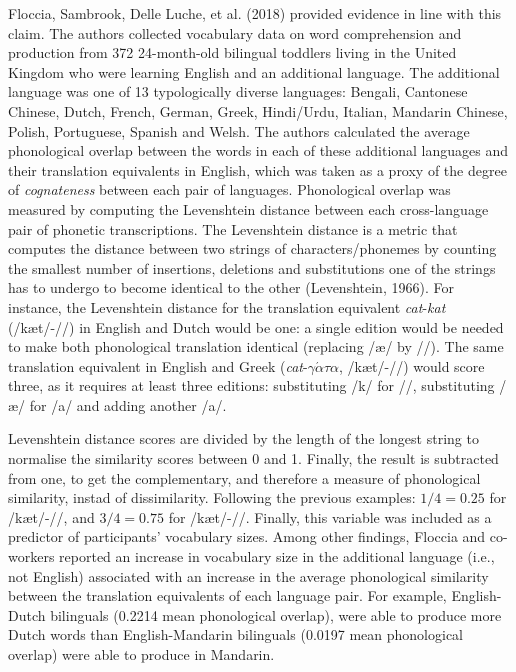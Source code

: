 \documentclass[
  man,
  floatsintext,
  colorlinks=true,linkcolor=blue,citecolor=blue,urlcolor=blue,biblatex]{apa7}
\begin{document}
Floccia, Sambrook, Delle Luche, et al. (2018) provided evidence in line
with this claim. The authors collected vocabulary data on word
comprehension and production from 372 24-month-old bilingual toddlers
living in the United Kingdom who were learning English and an additional
language. The additional language was one of 13 typologically diverse
languages: Bengali, Cantonese Chinese, Dutch, French, German, Greek,
Hindi/Urdu, Italian, Mandarin Chinese, Polish, Portuguese, Spanish and
Welsh. The authors calculated the average phonological overlap between
the words in each of these additional languages and their translation
equivalents in English, which was taken as a proxy of the degree of
\emph{cognateness} between each pair of languages. Phonological overlap
was measured by computing the Levenshtein distance between each
cross-language pair of phonetic transcriptions. The Levenshtein distance
is a metric that computes the distance between two strings of
characters/phonemes by counting the smallest number of insertions,
deletions and substitutions one of the strings has to undergo to become
identical to the other (Levenshtein, 1966). For instance, the
Levenshtein distance for the translation equivalent
\emph{cat}-\emph{kat} (/kæt/-//) in English and Dutch would
be one: a single edition would be needed to make both phonological
translation identical (replacing /æ/ by //). The same
translation equivalent in English and Greek
(\emph{cat}-\emph{\(\gamma\acute{\alpha}\tau\alpha\)},
/kæt/-//) would score three, as it requires at least three
editions: substituting /k/ for //, substituting /æ/ for /a/
and adding another /a/.

Levenshtein distance scores are divided by the length of the longest
string to normalise the similarity scores between 0 and 1. Finally, the
result is subtracted from one, to get the complementary, and therefore a
measure of phonological similarity, instad of dissimilarity. Following
the previous examples: \(1/4 = 0.25\) for /kæt/-//, and
\(3/4 = 0.75\) for /kæt/-//. Finally, this variable was
included as a predictor of participants' vocabulary sizes. Among other
findings, Floccia and co-workers reported an increase in vocabulary size
in the additional language (i.e., not English) associated with an
increase in the average phonological similarity between the translation
equivalents of each language pair. For example, English-Dutch bilinguals
(0.2214 mean phonological overlap), were able to produce more Dutch
words than English-Mandarin bilinguals (0.0197 mean phonological
overlap) were able to produce in Mandarin.
\end{document}
